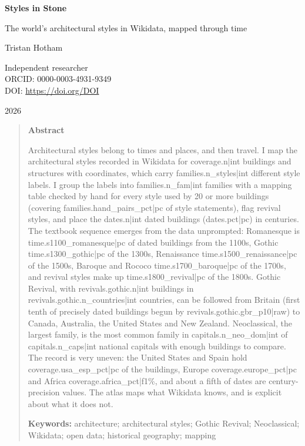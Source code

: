 \documentclass[11pt,a4paper]{article}
\begin{document}
\begin{center}
{\Large\bfseries Styles in Stone\par}
\vspace{0.4em}
{\large The world's architectural styles in Wikidata, mapped through time\par}
\vspace{1.2em}
{\large Tristan Hotham\par}
\vspace{0.3em}
{\small Independent researcher\\
ORCID: 0000-0003-4931-9349\\
DOI: \href{https://doi.org/{{DOI}}}{https://doi.org/{{DOI}}}\par}
\vspace{0.8em}
2026
\end{center}

\begin{quote}
\small
\begin{center}\textbf{Abstract}\end{center}
Architectural styles belong to times and places, and then travel. I map the architectural styles recorded in Wikidata for {{coverage.n|int}} buildings and structures with coordinates, which carry {{families.n_styles|int}} different style labels. I group the labels into {{families.n_fam|int}} families with a mapping table checked by hand for every style used by 20 or more buildings (covering {{families.hand_pairs_pct|pc}} of style statements), flag revival styles, and place the {{dates.n|int}} dated buildings ({{dates.pct|pc}}) in centuries. The textbook sequence emerges from the data unprompted: Romanesque is {{time.s1100_romanesque|pc}} of dated buildings from the 1100s, Gothic {{time.s1300_gothic|pc}} of the 1300s, Renaissance {{time.s1500_renaissance|pc}} of the 1500s, Baroque and Rococo {{time.s1700_baroque|pc}} of the 1700s, and revival styles make up {{time.s1800_revival|pc}} of the 1800s. Gothic Revival, with {{revivals.gothic.n|int}} buildings in {{revivals.gothic.n_countries|int}} countries, can be followed from Britain (first tenth of precisely dated buildings begun by {{revivals.gothic.gbr_p10|raw}}) to Canada, Australia, the United States and New Zealand. Neoclassical, the largest family, is the most common family in {{capitals.n_neo_dom|int}} of {{capitals.n_caps|int}} national capitals with enough buildings to compare. The record is very uneven: the United States and Spain hold {{coverage.usa_esp_pct|pc}} of the buildings, Europe {{coverage.europe_pct|pc}} and Africa {{coverage.africa_pct|f1}}\%, and about a fifth of dates are century-precision values. The atlas maps what Wikidata knows, and is explicit about what it does not.

\textbf{Keywords:} architecture; architectural styles; Gothic Revival; Neoclassical; Wikidata; open data; historical geography; mapping
\end{quote}
\end{document}
